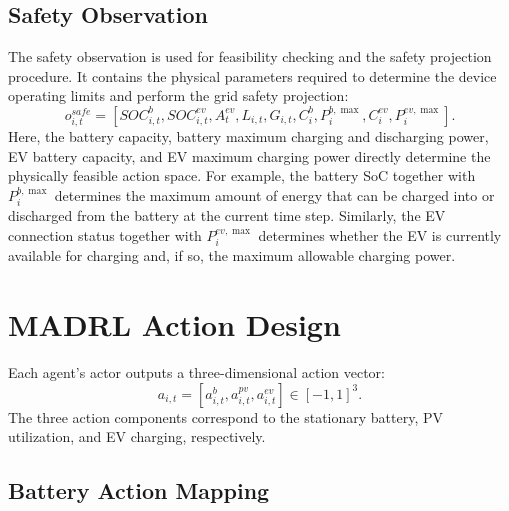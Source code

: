\subsection{Safety Observation}

The safety observation is used for feasibility checking and the safety projection procedure. It contains the physical parameters required to determine the device operating limits and perform the grid safety projection:
\[
  o^{safe}_{i,t}
  =
  [SOC^b_{i,t},SOC^{ev}_{i,t},A^{ev}_t,L_{i,t},G_{i,t},
  C^b_i,P^{b,\max}_i,C^{ev}_i,P^{ev,\max}_i].
\]
Here, the battery capacity, battery maximum charging and discharging power, EV battery capacity, and EV maximum charging power directly determine the physically feasible action space. For example, the battery SoC together with \(P^{b,\max}_i\) determines the maximum amount of energy that can be charged into or discharged from the battery at the current time step. Similarly, the EV connection status together with \(P^{ev,\max}_i\) determines whether the EV is currently available for charging and, if so, the maximum allowable charging power.

\section{MADRL Action Design}

Each agent's actor outputs a three-dimensional action vector:
\[
  a_{i,t}=[a^b_{i,t},a^{pv}_{i,t},a^{ev}_{i,t}]\in[-1,1]^3.
\]
The three action components correspond to the stationary battery, PV utilization, and EV charging, respectively.

\subsection{Battery Action Mapping}

